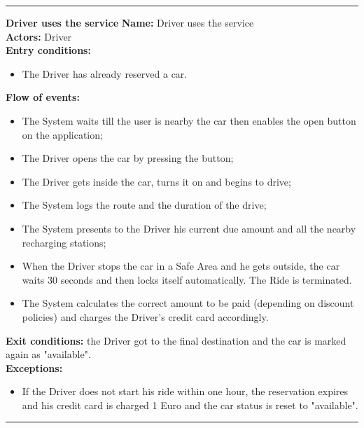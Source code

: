 \begin{center}
\noindent\rule{8cm}{1.0pt}
\end{center}


\textbf{\large Driver uses the service}
\bigbreak
\textbf{Name:} Driver uses the service\\
\textbf{Actors:} Driver \\
\textbf{Entry conditions:} 
\begin{itemize}
\item The Driver has already reserved a car.
\end{itemize}
\textbf{Flow of events:} 
\begin{itemize}
\item The System waits till the user is nearby the car then enables the open button on the application;
\item The Driver opens the car by pressing the button;
\item The Driver gets inside the car, turns it on and begins to drive;
\item The System logs the route and the duration of the drive;
\item The System presents to the Driver his current due amount and all the nearby recharging stations;
\item When the Driver stops the car in a Safe Area and he gets outside, the car waits 30 seconds and then locks itself automatically. The Ride is terminated.
\item The System calculates the correct amount to be paid (depending on discount policies) and charges the Driver's credit card accordingly.
\end{itemize}
\textbf{Exit conditions:} the Driver got to the final destination and the car is marked again as "available".\\
\textbf{Exceptions:}  
\begin{itemize}
\item If the Driver does not start his ride within one hour, the reservation expires and his credit card is charged 1 Euro and the car status is reset to "available". 
\end{itemize}

\begin{center}
\noindent\rule{8cm}{1.0pt}
\end{center}



